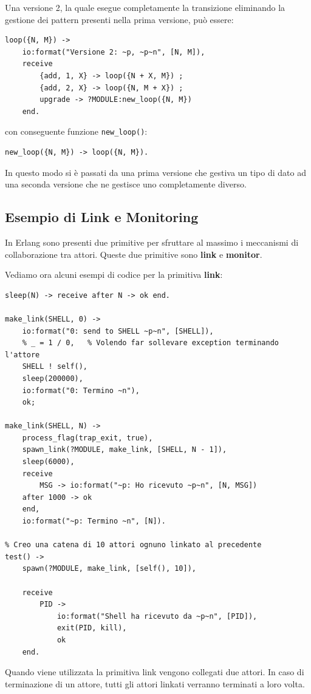 \documentclass{article}
\begin{document}
Una versione 2, la quale esegue completamente la transizione eliminando la gestione dei pattern presenti nella prima versione, può essere:
\begin{tcolorbox}
\begin{verbatim}
loop({N, M}) -> 
    io:format("Versione 2: ~p, ~p~n", [N, M]),
    receive
        {add, 1, X} -> loop({N + X, M}) ;
        {add, 2, X} -> loop({N, M + X}) ;
        upgrade -> ?MODULE:new_loop({N, M})
    end.
\end{verbatim}
\end{tcolorbox}
con conseguente funzione \texttt{new\_loop()}:
\begin{tcolorbox}
\begin{verbatim}
new_loop({N, M}) -> loop({N, M}).
\end{verbatim}
\end{tcolorbox}

In questo modo si è passati da una prima versione che gestiva un tipo di dato ad una seconda versione che ne gestisce uno completamente diverso.

\pagebreak

\subsection*{Esempio di Link e Monitoring}
In Erlang sono presenti due primitive per sfruttare al massimo i meccanismi di collaborazione tra attori. Queste due primitive sono \textbf{link} e \textbf{monitor}.

Vediamo ora alcuni esempi di codice per la primitiva \textbf{link}:
\begin{tcolorbox}
\begin{verbatim}
sleep(N) -> receive after N -> ok end.

make_link(SHELL, 0) ->
    io:format("0: send to SHELL ~p~n", [SHELL]),
    % _ = 1 / 0,   % Volendo far sollevare exception terminando l'attore
    SHELL ! self(),
    sleep(200000),
    io:format("0: Termino ~n"),
    ok;

make_link(SHELL, N) -> 
    process_flag(trap_exit, true),
    spawn_link(?MODULE, make_link, [SHELL, N - 1]),
    sleep(6000),
    receive
        MSG -> io:format("~p: Ho ricevuto ~p~n", [N, MSG])
    after 1000 -> ok
    end,
    io:format("~p: Termino ~n", [N]).

% Creo una catena di 10 attori ognuno linkato al precedente
test() -> 
    spawn(?MODULE, make_link, [self(), 10]),

    receive
        PID ->
            io:format("Shell ha ricevuto da ~p~n", [PID]),
            exit(PID, kill),
            ok
    end.
\end{verbatim}
\end{tcolorbox}
Quando viene utilizzata la primitiva link vengono collegati due attori. In caso di terminazione di un attore, tutti gli attori linkati verranno terminati a loro volta.
\end{document}
